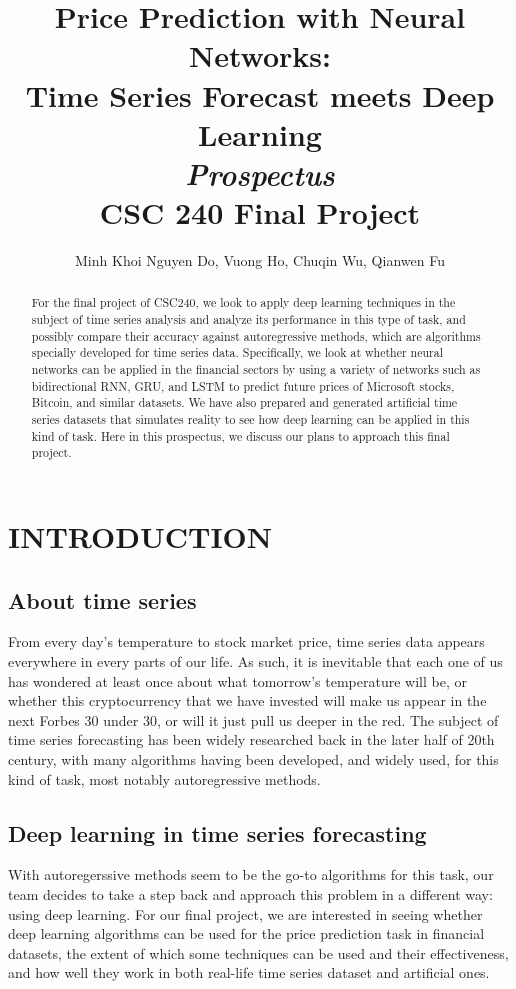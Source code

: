 \documentclass[letterpaper, 10 pt, conference]{ieeeconf}  %
\title{\LARGE
\textbf{Price Prediction with Neural Networks:\\ Time Series Forecast meets Deep Learning}\\
\Large
\textit{Prospectus}\\
\Large
CSC 240 Final Project
}
\author{Minh Khoi Nguyen Do, Vuong Ho, Chuqin Wu, Qianwen Fu}
\begin{document}
\maketitle
\thispagestyle{empty}
\pagestyle{empty}


\begin{abstract}
For the final project of CSC240, we look to apply deep learning techniques in the subject of time series analysis and analyze its performance in this type of task, and possibly compare their accuracy against autoregressive methods, which are algorithms specially developed for time series data. Specifically, we look at whether neural networks can be applied in the financial sectors by using a variety of networks such as bidirectional RNN, GRU, and LSTM to predict future prices of Microsoft stocks, Bitcoin, and similar datasets. We have also prepared and generated artificial time series datasets that simulates reality to see how deep learning can be applied in this kind of task. Here in this prospectus, we discuss our plans to approach this final project.

\end{abstract}


\section{INTRODUCTION}
\subsection{About time series}
    From every day's temperature to stock market price, time series data appears everywhere in every parts of our life. As such, it is inevitable that each one of us has wondered at least once about what tomorrow's temperature will be, or whether this cryptocurrency that we have invested will make us appear in the next Forbes 30 under 30, or will it just pull us deeper in the red. The subject of time series forecasting has been widely researched back in the later half of 20th century, with many algorithms having been developed, and widely used, for this kind of task, most notably autoregressive methods.

\subsection{Deep learning in time series forecasting}
    With autoregerssive methods seem to be the go-to algorithms for this task, our team decides to take a step back and approach this problem in a different way: using deep learning. For our final project, we are interested in seeing whether deep learning algorithms can be used for the price prediction task in financial datasets, the extent of which some techniques can be used and their effectiveness, and how well they work in both real-life time series dataset and artificial ones.
\end{document}
